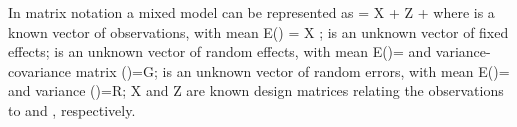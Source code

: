 In matrix notation a mixed model can be represented as
 = X \boldsymbol{\beta} + Z  + \boldsymbol{\epsilon}
where
 is a known vector of observations, with mean E() = X \boldsymbol{\beta};
\boldsymbol{\beta} is an unknown vector of fixed effects;
 is an unknown vector of random effects, with mean E()= and variance-covariance matrix ()=G;
\boldsymbol{\epsilon} is an unknown vector of random errors, with mean E(\boldsymbol{\epsilon})= and variance (\boldsymbol{\epsilon})=R;
X and Z are known design matrices relating the observations  to \boldsymbol{\beta} and , respectively.